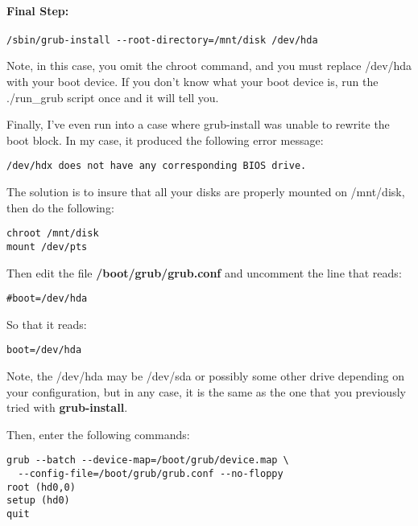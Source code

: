 \paragraph*{Final Step:}

\footnotesize
\begin{verbatim}
/sbin/grub-install --root-directory=/mnt/disk /dev/hda
\end{verbatim}
\normalsize

Note, in this case, you omit the chroot command, and you must
replace /dev/hda with your boot device.  If you don't know what your
boot device is, run the ./run\_grub script once and it will tell
you.

Finally, I've even run into a case where grub-install was unable to
rewrite the boot block. In my case, it produced the following error
message:

\footnotesize
\begin{verbatim}
/dev/hdx does not have any corresponding BIOS drive.
\end{verbatim}
\normalsize

The solution is to insure that all your disks are properly mounted on
/mnt/disk, then do the following:

\footnotesize
\begin{verbatim}
chroot /mnt/disk
mount /dev/pts
\end{verbatim}
\normalsize

Then edit the file {\bf /boot/grub/grub.conf} and uncomment the line
that reads:

\footnotesize
\begin{verbatim}
#boot=/dev/hda
\end{verbatim}
\normalsize

So that it reads:

\footnotesize
\begin{verbatim}
boot=/dev/hda
\end{verbatim}
\normalsize

Note, the /dev/hda may be /dev/sda or possibly some other drive depending
on your configuration, but in any case, it is the same as the one that
you previously tried with {\bf grub-install}.

Then, enter the following commands:

\footnotesize
\begin{verbatim}
grub --batch --device-map=/boot/grub/device.map \
  --config-file=/boot/grub/grub.conf --no-floppy
root (hd0,0)
setup (hd0)
quit
\end{verbatim}
\normalsize

